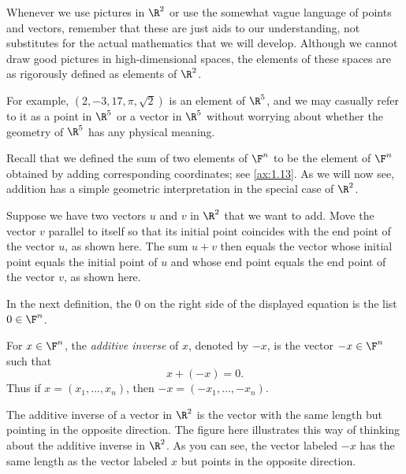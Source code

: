 %
Whenever we use pictures in $\R^2$ or use the somewhat vague language of points
and vectors, remember that these are just aids to our understanding, not
substitutes for the actual mathematics that we will develop. Although we cannot
draw good pictures in high-dimensional spaces, the elements of these spaces are
as rigorously defined as elements of $\R^2$.

For example, $(2,-3,17,\pi,\sqrt2)$ is an element of $\R^5$, and we may
casually refer to it as a point in $\R^5$ or a vector in $\R^5$ without
worrying about whether the geometry of $\R^5$ has any physical meaning.

Recall that we defined the sum of two elements of $\F^n$ to be the element of
$\F^n$ obtained by adding corresponding coordinates; see \ref{ax:1.13}. As we
will now see, addition has a simple geometric interpretation in the special
case of $\R^2$.

%
Suppose we have two vectors $u$ and $v$ in $\R^2$ that we want to add. Move the
vector $v$ parallel to itself so that its initial point coincides with the end
point of the vector $u$, as shown here. The sum $u+v$ then equals the vector
whose initial point equals the initial point of $u$ and whose end point equals
the end point of the vector $v$, as shown here.

In the next definition, the $0$ on the right side of the displayed equation is
the list $0\in\F^n$.

\begin{definition}\label{ax:1.17}
For $x\in\F^n$, the \emph{additive inverse} of $x$, denoted by $-x$, is the
vector $-x\in\F^n$ such that
\[ x+(-x)=0. \]
Thus if $x=(x_1,\dots,x_n)$, then $-x=(-x_1,\dots,-x_n)$.
\end{definition}

%
The additive inverse of a vector in $\R^2$ is the vector with the same length
but pointing in the opposite direction. The figure here illustrates this way of
thinking about the additive inverse in $\R^2$. As you can see, the vector
labeled $-x$ has the same length as the vector labeled $x$ but points in the
opposite direction.

